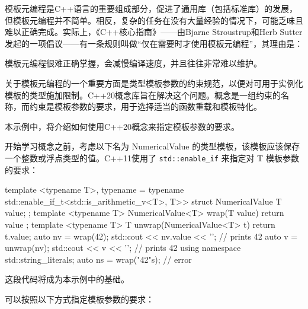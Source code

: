 

模板元编程是C++语言的重要组成部分，促进了通用库（包括标准库）的发展，但模板元编程并不简单。相反，复杂的任务在没有大量经验的情况下，可能乏味且难以正确完成。实际上，《C++核心指南》——由Bjarne Stroustrup和Herb Sutter发起的一项倡议——有一条规则叫做“仅在需要时才使用模板元编程”，其理由是：

\begin{myTip}
模板元编程很难正确掌握，会减慢编译速度，并且往往非常难以维护。
\end{myTip}

关于模板元编程的一个重要方面是类型模板参数的约束规范，以便对可用于实例化模板的类型施加限制。C++20概念库旨在解决这个问题。概念是一组约束的名称，而约束是模板参数的要求，用于选择适当的函数重载和模板特化。

本示例中，将介绍如何使用C++20概念来指定模板参数的要求。


开始学习概念之前，考虑以下名为 NumericalValue 的类型模板，该模板应该保存一个整数或浮点类型的值。C++11使用了 \verb|std::enable_if| 来指定对 T 模板参数的要求：

\begin{cpp}
template <typename T>,
          typename = typename std::enable_if_t<std::is_arithmetic_v<T>, T>>
struct NumericalValue
{
    T value;
};
template <typename T>
NumericalValue<T> wrap(T value) { return { value }; }
template <typename T>
T unwrap(NumericalValue<T> t) { return t.value; }
auto nv = wrap(42);
std::cout << nv.value << '\n';   // prints 42
auto v = unwrap(nv);
std::cout << v << '\n';          // prints 42
using namespace std::string_literals;
auto ns = wrap("42"s);           // error
\end{cpp}

这段代码将成为本示例中的基础。


可以按照以下方式指定模板参数的要求：

